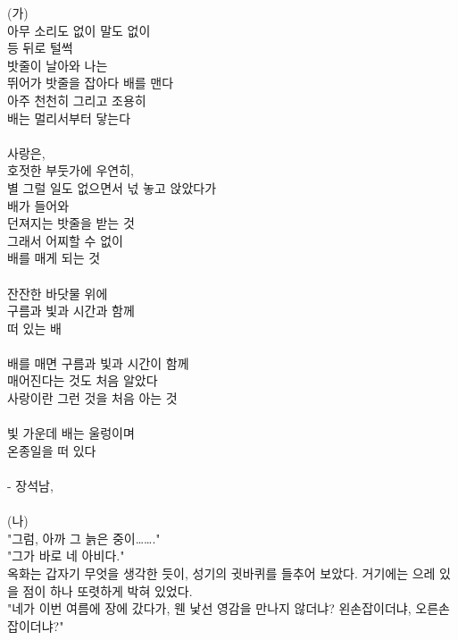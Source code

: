 \documentclass[10pt,a4paper]{article}
\begin{document}
\begin{tcolorbox}[passage]
(가) \\{}
아무 소리도 없이 말도 없이 \\{}
등 뒤로 털썩 \\{}
밧줄이 날아와 나는 \\{}
뛰어가 밧줄을 잡아다 배를 맨다 \\{}
아주 천천히 그리고 조용히 \\{}
배는 멀리서부터 닿는다 \\{}
\vspace{4pt} \\{}
사랑은, \\{}
호젓한 부둣가에 우연히, \\{}
별 그럴 일도 없으면서 넋 놓고 앉았다가 \\{}
배가 들어와 \\{}
던져지는 밧줄을 받는 것 \\{}
그래서 어찌할 수 없이 \\{}
배를 매게 되는 것 \\{}
\vspace{4pt} \\{}
잔잔한 바닷물 위에 \\{}
구름과 빛과 시간과 함께 \\{}
떠 있는 배 \\{}
\vspace{4pt} \\{}
배를 매면 구름과 빛과 시간이 함께 \\{}
매어진다는 것도 처음 알았다 \\{}
사랑이란 그런 것을 처음 아는 것 \\{}
\vspace{4pt} \\{}
빛 가운데 배는 울렁이며 \\{}
온종일을 떠 있다 \\{}
\vspace{4pt} \\{}
- 장석남,  \\{}
\vspace{4pt} \\{}
(나) \\{}
"그럼, 아까 그 늙은 중이……." \\{}
"그가 바로 네 아비다." \\{}
옥화는 갑자기 무엇을 생각한 듯이, 성기의 귓바퀴를 들추어 보았다. 거기에는 으레 있을 점이 하나 또렷하게 박혀 있었다. \\{}
"네가 이번 여름에 장에 갔다가, 웬 낯선 영감을 만나지 않더냐? 왼손잡이더냐, 오른손잡이더냐?" \\{}

\end{tcolorbox}
\end{document}
